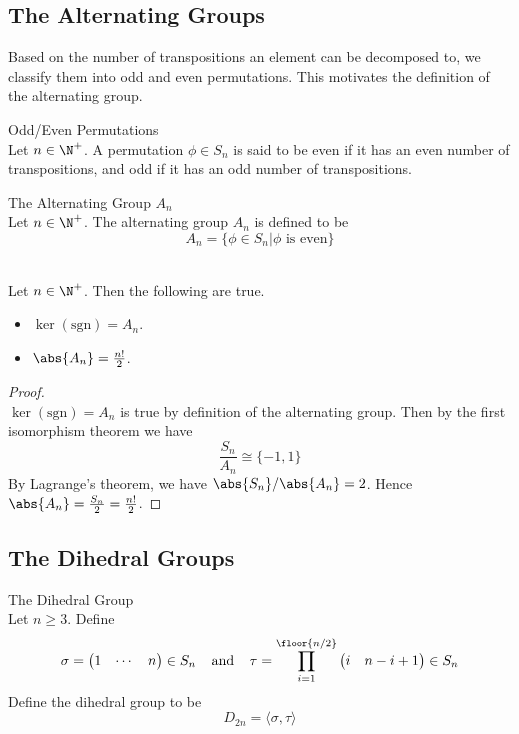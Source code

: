 \documentclass[a4paper]{article}
\begin{document}
\subsection{The Alternating Groups}
Based on the number of transpositions an element can be decomposed to, we classify them into odd and even permutations. This motivates the definition of the alternating group. 

\begin{defn}{Odd/Even Permutations}{}\\
Let $n\in\N^+$. A permutation $\phi\in S_n$ is said to be even if it has an even number of transpositions, and odd if it has an odd number of transpositions. 
\end{defn}

\begin{defn}{The Alternating Group $A_n$}{}\\
Let $n\in\N^+$. The alternating group $A_n$ is defined to be $$A_n=\{\phi\in S_n|\phi\text{ is even}\}$$
\end{defn}

\begin{lmm}{}{}\\
Let $n\in\N^+$. Then the following are true. 
\begin{itemize}
\item $\ker(\text{sgn})=A_n$. 
\item $\abs{A_n}=\frac{n!}{2}$. 
\end{itemize}
\begin{proof}\\
$\ker(\text{sgn})=A_n$ is true by definition of the alternating group. Then by the first isomorphism theorem we have $$\frac{S_n}{A_n}\cong\{-1,1\}$$ By Lagrange's theorem, we have $\abs{S_n}/\abs{A_n}=2$. Hence $\abs{A_n}=\frac{S_n}{2}=\frac{n!}{2}$. 
\end{proof}
\end{lmm}

\subsection{The Dihedral Groups}
\begin{defn}{The Dihedral Group}{}\\
Let $n\geq 3$. Define $$\sigma=\begin{pmatrix}1 & \cdots &  n\end{pmatrix}\in S_n\text{\;\;\;\;and\;\;\;\;}\tau=\prod_{i=1}^{\floor{n/2}}\begin{pmatrix}i & n-i+1\end{pmatrix}\in S_n$$ Define the dihedral group to be $$D_{2n}=\langle\sigma,\tau\rangle$$
\end{defn}
\end{document}
